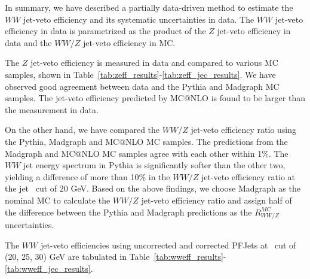 In summary, we have described a partially data-driven method to 
estimate the $WW$ jet-veto efficiency and its systematic uncertainties 
in data. The $WW$ jet-veto efficiency in data is parametrized as the product 
of the $Z$ jet-veto efficiency in data and the $WW/Z$ jet-veto efficiency 
in MC. 

The $Z$ jet-veto efficiency is measured in data and 
compared to various MC samples, shown in 
Table~\ref{tab:zeff_results}-\ref{tab:zeff_jec_results}. 
We have observed good agreement between data and the Pythia
 and Madgraph MC samples. 
The jet-veto efficiency predicted by MC@NLO is found to be 
larger than the measurement in data.

On the other hand, we have compared the $WW/Z$ jet-veto 
efficiency ratio using the Pythia, Madgraph and MC@NLO MC samples. 
The predictions from the Madgraph and MC@NLO MC samples 
agree with each other within 1\%. 
The $WW$ jet energy spectrum in Pythia is significantly softer 
than the other two, yielding a difference of more than 10\% in the 
$WW/Z$ jet-veto efficiency ratio at the jet \pt\, cut of 20 GeV. 
Based on the above findings, we choose Madgraph as the 
nominal MC to calculate the $WW/Z$ jet-veto efficiency ratio 
and assign half of the difference between the Pythia and Madgraph 
predictions as the $R_{WW/Z}^{MC}$ uncertainties. 

The $WW$ jet-veto efficiencies using uncorrected and 
corrected PFJets at \pt\, cut of (20, 25, 30) GeV are tabulated 
in Table~\ref{tab:wweff_results}-\ref{tab:wweff_jec_results}. 

